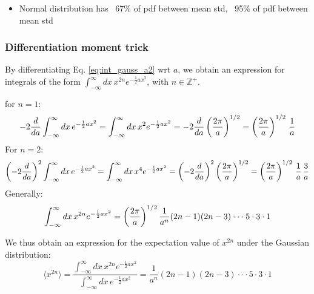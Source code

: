\documentclass[11pt]{article}
\begin{document}
\begin{itemize}
  \item Normal distribution has ~67\% of pdf between mean  std, ~95\% of pdf
  between mean  std
\end{itemize}


\subsubsection{Differentiation moment trick}
\label{subsubsec:dmt}
By differentiating Eq. \ref{eq:int_gauss_a2} wrt $a$, we obtain an expression for
integrals of the form $\int_{-\infty}^{\infty}dx \, x^{2n} e^{-\frac{1}{2} a x^2}$, with
$n \in \mathbb{Z^+}$.

\eeg for $n=1$:
\begin{equation}
  - 2 \frac{d}{da} \int_{-\infty}^{\infty}dx \, e^{-\frac{1}{2} a x^2} =
  \int_{-\infty}^{\infty}dx \, x^2 e^{-\frac{1}{2} a x^2} =
  - 2 \frac{d}{da} \left( \frac{2\pi}{a} \right)^{1/2} =
  \left( \frac{2\pi}{a} \right)^{1/2} \, \frac{1}{a} 
\end{equation}
For $n=2$:
\begin{equation}
  \left( -2 \frac{d}{da} \right)^2 \int_{-\infty}^{\infty}dx \, e^{-\frac{1}{2} a x^2} =
  \int_{-\infty}^{\infty}dx \, x^4 e^{-\frac{1}{2} a x^2} =
  \left( -2 \frac{d}{da} \right)^2 \left( \frac{2\pi}{a} \right)^{1/2} =
  \left( \frac{2\pi}{a} \right)^{1/2} \, \frac{1}{a} \, \frac{3}{a}
\end{equation}
Generally:
\begin{equation}
  \int_{-\infty}^{\infty}dx \, x^{2n} e^{-\frac{1}{2} a x^2} =
  \left( \frac{2\pi}{a} \right)^{1/2} \frac{1}{a^n} (2n-1) (2n-3) \cdot\cdot\cdot 5 \cdot 3
  \cdot 1 
\end{equation}

We thus obtain an expression for the expectation value of $x^{2n}$ under the Gaussian
distribution: 
\begin{equation}
  \label{eq:x2n_moments}
  \langle x^{2n} \rangle =
  \frac{\int_{-\infty}^{\infty}dx \, x^{2n} e^{-\frac{1}{2} a x^2}}
       {\int_{-\infty}^{\infty}dx \, e^{-\frac{1}{2} a x^2}} =
  \frac{1}{a^n} (2n-1) (2n-3) \cdot\cdot\cdot 5 \cdot 3 \cdot 1
\end{equation}
\end{document}
